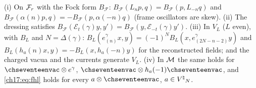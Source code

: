 \begin{theorem}\label{ch17:thm:genadjoint}
(i) On $\mathcal{F}_r$ with the Fock form $B_{\mathcal F}$: $B_{\mathcal F}(L_np,q)=B_{\mathcal F}(p,L_{-n}q)$ and $B_{\mathcal F}(\alpha(n)p,q)=-B_{\mathcal F}(p,\alpha(-n)q)$ (frame
oscillators are skew).  (ii) The dressing satisfies $B_{\mathcal F}(\mathcal E_t(\gamma)y,y')=B_{\mathcal F}(y,\mathcal E_{-t}(\gamma)y')$.  (iii) In $V_L$
($L$ even), with $B_L$ and $N=\Delta(\gamma)$: $B_L(e^\gamma_{(n)}x,y)=(-1)^NB_L(x,e^\gamma_{(2N-n-2)}y)$ and
$B_L(h_a(n)x,y)=-B_L(x,h_a(-n)y)$ for the reconstructed fields; and the charged vacua and the currents generate $V_L$.
(iv) In $\mathcal{M}$ the same holds for $\chseventeenvac\otimes e^\gamma$, $\chseventeenvac\otimes h_a(-1)\chseventeenvac$, and \eqref{ch17:eq:fhl} holds for every
$a\otimes\chseventeenvac$, $a\in{V^{\natural}}_N$.
\end{theorem}

